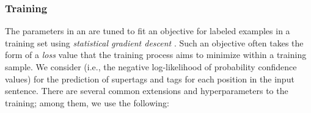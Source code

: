 \documentclass[../document.tex]{subfiles}
\begin{document}
    \subsubsection{Training}\label{sec:preliminaries:nn:training}
    The parameters in an  are tuned to fit an objective for labeled examples in a training set using \emph{statistical gradient descent} .
    Such an objective often takes the form of a \emph{loss} value that the training process aims to minimize within a training sample.
    We consider  (i.e., the negative log-likelihood of probability confidence values) for the prediction of supertags and  tags for each position in the input sentence.
    There are several common extensions and hyperparameters to the training; among them, we use the following:
\end{document}

